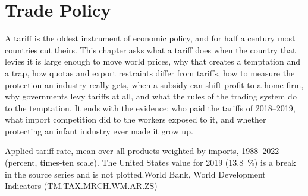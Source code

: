 \chapter{Trade Policy}\label{ch:b3:trade-policy}

A tariff is the oldest instrument of economic policy, and for half a century most
countries cut theirs. This chapter asks what a tariff does when the country that
levies it is large enough to move world prices, why that creates a temptation and
a trap, how quotas and export restraints differ from tariffs, how to measure
the protection an industry really gets, when a subsidy can shift profit to a home
firm, why governments levy tariffs at all, and what the rules of the trading
system do to the temptation. It ends with the evidence: who paid the
tariffs of 2018--2019, what import competition did to the workers exposed to it,
and whether protecting an infant industry ever made it grow up.

\begin{openingchart}{Applied tariff rate, mean over all products weighted by
imports, 1988--2022 (percent, times-ten scale). The United States value for 2019 (13.8~\%)
is a break in the source series and is not plotted.}{World Bank, World
Development Indicators (TM.TAX.MRCH.WM.AR.ZS)}
\end{openingchart}

